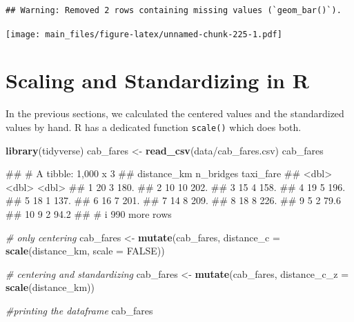 \documentclass[
]{book}
\newenvironment{Shaded}{\begin{snugshade}}{\end{snugshade}}
\newcommand{\AttributeTok}[1]{\textcolor[rgb]{0.13,0.29,0.53}{#1}}
\newcommand{\CommentTok}[1]{\textcolor[rgb]{0.56,0.35,0.01}{\textit{#1}}}
\newcommand{\ConstantTok}[1]{\textcolor[rgb]{0.56,0.35,0.01}{#1}}
\newcommand{\FunctionTok}[1]{\textcolor[rgb]{0.13,0.29,0.53}{\textbf{#1}}}
\newcommand{\NormalTok}[1]{#1}
\newcommand{\OtherTok}[1]{\textcolor[rgb]{0.56,0.35,0.01}{#1}}
\newcommand{\StringTok}[1]{\textcolor[rgb]{0.31,0.60,0.02}{#1}}
\begin{document}
\begin{verbatim}
## Warning: Removed 2 rows containing missing values (`geom_bar()`).
\end{verbatim}

\texttt{[image: main\_files/figure-latex/unnamed-chunk-225-1.pdf]}

\hypertarget{scaling-and-standardizing-in-r}{%
\section{Scaling and Standardizing in R}\label{scaling-and-standardizing-in-r}}

In the previous sections, we calculated the centered values and the standardized values by hand. R has a dedicated function \texttt{scale()} which does both.

\begin{Shaded}
\begin{Highlighting}[]
\FunctionTok{library}\NormalTok{(tidyverse)}
\NormalTok{cab\_fares }\OtherTok{\textless{}{-}} \FunctionTok{read\_csv}\NormalTok{(}\StringTok{\textquotesingle{}data/cab\_fares.csv\textquotesingle{}}\NormalTok{)}
\NormalTok{cab\_fares}
\end{Highlighting}
\end{Shaded}

\begin{Shaded}
\begin{Highlighting}[]
\NormalTok{\#\# \# A tibble: 1,000 x 3}
\NormalTok{\#\#    distance\_km n\_bridges taxi\_fare}
\NormalTok{\#\#          \textless{}dbl\textgreater{}     \textless{}dbl\textgreater{}     \textless{}dbl\textgreater{}}
\NormalTok{\#\#  1          20         3     180. }
\NormalTok{\#\#  2          10        10     202. }
\NormalTok{\#\#  3          15         4     158. }
\NormalTok{\#\#  4          19         5     196. }
\NormalTok{\#\#  5          18         1     137. }
\NormalTok{\#\#  6          16         7     201. }
\NormalTok{\#\#  7          14         8     209. }
\NormalTok{\#\#  8          18         8     226. }
\NormalTok{\#\#  9           5         2      79.6}
\NormalTok{\#\# 10           9         2      94.2}
\NormalTok{\#\# \# i 990 more rows}
\end{Highlighting}
\end{Shaded}

\begin{Shaded}
\begin{Highlighting}[]
\CommentTok{\# only centering}
\NormalTok{cab\_fares }\OtherTok{\textless{}{-}} \FunctionTok{mutate}\NormalTok{(cab\_fares, }\AttributeTok{distance\_c =} \FunctionTok{scale}\NormalTok{(distance\_km, }\AttributeTok{scale =} \ConstantTok{FALSE}\NormalTok{))}

\CommentTok{\# centering and standardizing}
\NormalTok{cab\_fares }\OtherTok{\textless{}{-}} \FunctionTok{mutate}\NormalTok{(cab\_fares, }\AttributeTok{distance\_c\_z =} \FunctionTok{scale}\NormalTok{(distance\_km))}

\CommentTok{\#printing the dataframe}
\NormalTok{cab\_fares}
\end{Highlighting}
\end{Shaded}
\end{document}
